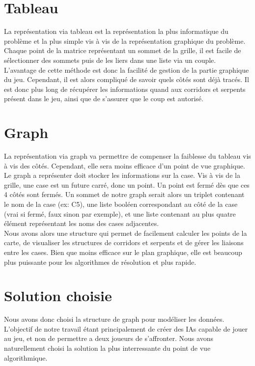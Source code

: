 \documentclass[a4paper,12pt]{report}
\begin{document}
\section{Tableau}

La repr\'esentation via tableau est la repr\'esentation la plus informatique du probl\`eme et la plus simple vis \`a vis de la repr\'esentation graphique du probl\`eme. Chaque point de la matrice repr\'esentant un sommet de la grille, il est facile de s\'electionner des sommets puis de les liers dans une liste via un couple.\\
L'avantage de cette m\'ethode est donc la facilit\'e de gestion de la partie graphique du jeu. Cependant, il est alors compliqu\'e de savoir quels c\^ot\'es sont d\'ej\`a trac\'es. Il est donc plus long de r\'ecup\'erer les informations quand aux corridors et serpents pr\'esent dans le jeu, ainsi que de s'assurer que le coup est autoris\'e.

\section{Graph}

La repr\'esentation via graph va permettre de compenser la faiblesse du tableau vis \`a vis des c\^ot\'es. Cependant, elle sera moins efficace d'un point de vue graphique. Le graph a repr\'esenter doit stocker les informations sur la case. Vis \`a vis de la grille, une case est un future carr\'e, donc un point. Un point est ferm\'e d\`es que ces 4 c\^ot\'es sont ferm\'es. Un sommet de notre graph serait alors un triplet contenant le nom de la case (ex: C5), une liste bool\'een correspondant au c\^ot\'e de la case (vrai si ferm\'e, faux sinon par exemple), et une liste contenant au plus quatre \'el\'ement repr\'esentant les noms des cases adjacentes. \\
Nous avons alors une structure qui permet de facilement calculer les points de la carte, de visualiser les structures de corridors et serpents et de g\'erer les liaisons entre les cases. Bien que moins efficace sur le plan graphique, elle est beaucoup plus puissante pour les algorithmes de r\'esolution et plus rapide. 

\section{Solution choisie}

Nous avons donc choisi la structure de graph pour mod\'eliser les donn\'ees. L'objectif de notre travail \'etant principalement de cr\'eer des IAs capable de jouer au jeu, et non de permettre a deux joueurs de s'affronter. Nous avons naturellement choisi la solution la plus interressante du point de vue algorithmique. 
\end{document}
